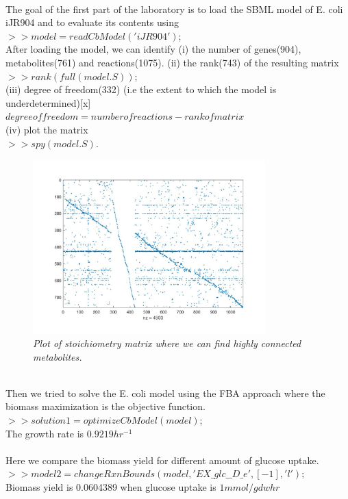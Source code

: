 \documentclass[11pt, a4paper]{article}
\begin{document}
	~\\The goal of the first part of the laboratory is to load the SBML model of E. coli iJR904 and to evaluate its contents using\\$>>model=readCbModel('iJR904')$;\\After loading the model, we can identify (i) the number of genes(904), metabolites(761) and reactions(1075). (ii) the rank(743) of the resulting matrix\\$>>rank(full(model.S))$;\\(iii) degree of freedom(332) (i.e the extent to which the model is underdetermined)[x]\\$degree of freedom = number of reactions - rank of matrix$\\(iv) plot the matrix\\$>>spy(model.S)$.
	\begin{figure}[H]
  		\centering
      	\includegraphics[width=0.8\textwidth]{matrix_plot.jpg}
      	\caption{\textit{Plot of stoichiometry matrix where we can find highly connected metabolites.}}
	\end{figure}
	~\\Then we tried to solve the E. coli model using the FBA approach where the biomass maximization is the objective function.\\$>>solution1 = optimizeCbModel(model)$;\\
	The growth rate is $0.9219 hr^{-1}$\\\\
	Here we compare the biomass yield for different amount of glucose uptake.\\
	$>>model2=changeRxnBounds(model,'EX\_glc\_\_D\_e',[-1],'l');$\\
	Biomass yield is 0.0604389 when glucose uptake is $1 mmol/gdw hr$
\end{document}
